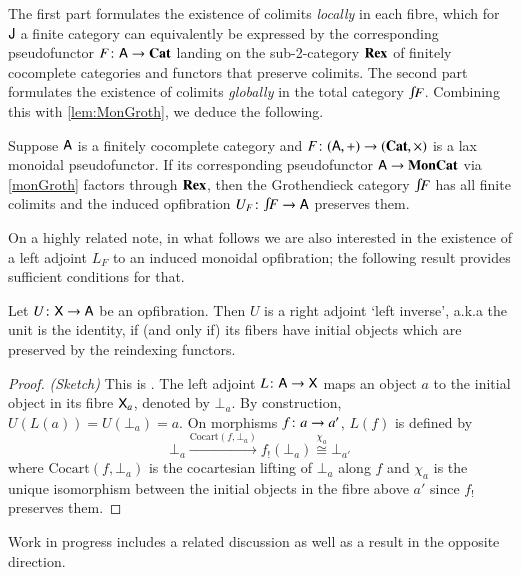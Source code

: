 \documentclass[reqno]{amsart}
\begin{document}
The first part formulates the existence of colimits \emph{locally} in each fibre, which for $\mathsf{J}$ a finite category can equivalently be expressed by the corresponding pseudofunctor $F\colon\mathsf{A}\to\mathbf{Cat}$ landing on the sub-2-category $\mathbf{Rex}$ of finitely cocomplete categories and functors that preserve colimits. The second part formulates the existence of colimits \emph{globally} in the total category $\inta F$. Combining this with \cref{lem:MonGroth}, we deduce the following.

\begin{cor}\label{cor:fcocMonGroth}
 Suppose $\mathsf{A}$ is a finitely cocomplete category and $F\colon(\mathsf{A},+)\to(\mathbf{Cat},\times)$ is a lax monoidal pseudofunctor. If its corresponding pseudofunctor $\mathsf{A}\to\mathbf{MonCat}$ via \cref{monGroth} 
 factors through $\mathbf{Rex}$, then the Grothendieck category $\inta F$ has all finite colimits and the induced opfibration $U_F\maps\inta F\to\A$ preserves them. 
\end{cor}

On a highly related note, in what follows we are also interested in the existence of a left adjoint $L_F$ to an induced monoidal opfibration; the following result provides sufficient conditions for that.

\begin{lem}\label{prop:opfibtolari}
  Let $U \colon\mathsf{X} \to \mathsf{A}$ be an opfibration. Then
  $U$ is a right adjoint `left inverse', a.k.a the unit is the identity, if (and only if) its fibers have
  initial objects which are preserved by the
  reindexing functors.
\end{lem}

\begin{proof}\emph{(Sketch)}
 This is \cite[Proposition~4.4]{Gray}. The left adjoint $L\colon\mathsf{A}\to\mathsf{X}$ maps an object $a$ to the initial object in its fibre $\mathsf{X}_a$, denoted by $\bot_a$. By construction, $U(L(a))=U(\bot_a)=a$. On morphisms $f\colon a\to a'$, $L(f)$ is defined by
 \begin{equation}\label{eq:Lonarrows}
  \bot_a\xrightarrow{\mathrm{Cocart}(f,\bot_a)}f_!(\bot_a)\stackrel{\chi_a}{\cong}\bot_{a'}
 \end{equation}
where $\mathrm{Cocart}(f,\bot_a)$ is the cocartesian lifting of $\bot_a$ along $f$ and $\chi_a$ is the unique isomorphism between the initial objects in the fibre above $a'$ since $f_!$ preserves them.
\end{proof}

Work in progress \cite{CV} includes a related discussion as well as a result in the opposite direction.
\end{document}
